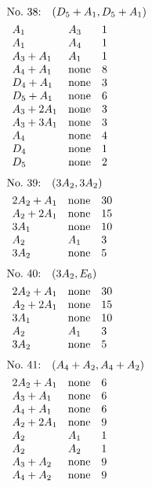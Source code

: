 %
%
\begin{align*}
&\hbox to 4cm {\textrm{No.~38:}\quad$(D_{5}+A_{1}, D_{5}+A_{1})$\hss}\\ 
&\begin{array}{lll}
A_{1} & A_{3} & 1\\
A_{1} & A_{4} & 1\\
A_{3}+A_{1} & A_{1} & 1\\
A_{4}+A_{1} & \none & 8\\
D_{4}+A_{1} & \none & 3\\
D_{5}+A_{1} & \none & 6\\
A_{3}+2A_{1} & \none & 3\\
A_{3}+3A_{1} & \none & 3\\
A_{4} & \none & 4\\
D_{4} & \none & 1\\
D_{5} & \none & 2\\
\end{array}
\end{align*}
%
%
\begin{align*}
&\hbox to 4cm {\textrm{No.~39:}\quad$(3A_{2}, 3A_{2})$\hss}\\ 
&\begin{array}{lll}
2A_{2}+A_{1} & \none & 30\\
A_{2}+2A_{1} & \none & 15\\
3A_{1} & \none & 10\\
A_{2} & A_{1} & 3\\
3A_{2} & \none & 5\\
\end{array}
\end{align*}
%
%
\begin{align*}
&\hbox to 4cm {\textrm{No.~40:}\quad$(3A_{2}, E_{6})$\hss}\\ 
&\begin{array}{lll}
2A_{2}+A_{1} & \none & 30\\
A_{2}+2A_{1} & \none & 15\\
3A_{1} & \none & 10\\
A_{2} & A_{1} & 3\\
3A_{2} & \none & 5\\
\end{array}
\end{align*}
%
%
\begin{align*}
&\hbox to 4cm {\textrm{No.~41:}\quad$(A_{4}+A_{2}, A_{4}+A_{2})$\hss}\\ 
&\begin{array}{lll}
2A_{2}+A_{1} & \none & 6\\
A_{3}+A_{1} & \none & 6\\
A_{4}+A_{1} & \none & 6\\
A_{2}+2A_{1} & \none & 9\\
A_{2} & A_{1} & 1\\
A_{2} & A_{2} & 1\\
A_{3}+A_{2} & \none & 9\\
A_{4}+A_{2} & \none & 9\\
\end{array}
\end{align*}
